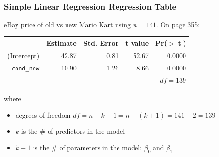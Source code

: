 \documentclass[slides]{beamer}
\newcommand{\blue}[1]{\textcolor{blue2}{#1}}
\begin{document}

%
%
%
%
%


\begin{frame}[fragile]
\frametitle{Simple Linear Regression Regression Table}

eBay price of old vs new Mario Kart using $n=141$.  On page 355:

\begin{table}[ht]
\centering
\begin{tabular}{r|rrrr}
  \hline
 & Estimate & Std. Error & t value & Pr($>$$|$t$|$) \\ 
  \hline
(Intercept) & 42.87 & 0.81 & 52.67 & 0.0000 \\ 
{\tt cond\_new} & 10.90 & 1.26 & 8.66 & 0.0000 \\ 
   \hline
   & & & & $df=139$\\
\end{tabular}
\end{table}

%
%
\pause where
\begin{itemize}
\item degrees of freedom $df=n-k-1 = n -(k+1) =141-2=139$
\item $k$ is the \# of predictors in the model
\item $k+1$ is the \# of parameters in the model: $\beta_0$ and $\beta_1$
\end{itemize}

\end{frame}
\end{document}
